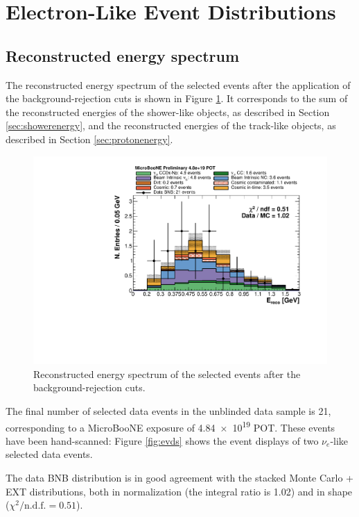
\section{Electron-Like Event Distributions}\label{sec:electron_like}
\subsection{Reconstructed energy spectrum}
The reconstructed energy spectrum of the selected events after the application of the background-rejection cuts is shown in Figure \ref{fig:spectrum_after}. It corresponds to the sum of the reconstructed energies of the shower-like objects, as described in Section \ref{sec:showerenergy}, and the reconstructed energies of the track-like objects, as described in Section \ref{sec:protonenergy}. 

\begin{figure}[htbp]
\centering
  \includegraphics[width=0.65\linewidth]{figures/h_fixed_energy_after.pdf}
    \caption{Reconstructed energy spectrum of the selected events after the background-rejection cuts.}\label{fig:spectrum_after}

\end{figure}


The final number of selected data events in the unblinded data sample is 21, corresponding to a MicroBooNE exposure of \num{4.84e19} POT. These events have been hand-scanned: Figure \ref{fig:evds} shows the event displays of two $\nu_{e}$-like selected data events.


The data BNB distribution is in good agreement with the stacked Monte Carlo + EXT distributions, both in normalization (the integral ratio is 1.02) and in shape ($\chi^2 /\mathrm{n.d.f.} = 0.51$). 


